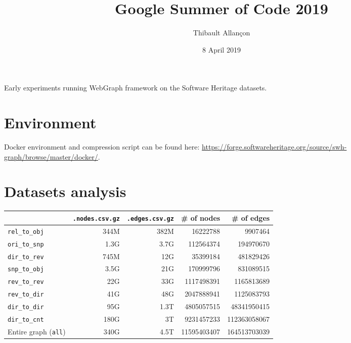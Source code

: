 \documentclass[11pt,a4paper]{article}
\title{Google Summer of Code 2019}
\author{Thibault Allançon}
\date{8 April 2019}
\begin{document}
\maketitle

Early experiments running WebGraph framework on the Software Heritage datasets.

\section{Environment}

Docker environment and compression script can be found here:
\url{https://forge.softwareheritage.org/source/swh-graph/browse/master/docker/}.

\section{Datasets analysis}

\begin{center}
    \begin{tabular}{@{} l *4r @{}}
        \toprule
        \multicolumn{1}{c}{} &
            \textbf{\texttt{.nodes.csv.gz}} &
            \textbf{\texttt{.edges.csv.gz}} &
            \textbf{\# of nodes} & \textbf{\# of edges} \\
        \midrule
        \texttt{rel\_to\_obj}
            & 344M & 382M & \num{16222788} & \num{9907464} \\
        \texttt{ori\_to\_snp}
            & 1.3G & 3.7G & \num{112564374} & \num{194970670} \\
        \texttt{dir\_to\_rev}
            & 745M & 12G & \num{35399184} & \num{481829426} \\
        \texttt{snp\_to\_obj}
            & 3.5G & 21G & \num{170999796} & \num{831089515} \\
        \texttt{rev\_to\_rev}
            & 22G & 33G & \num{1117498391} & \num{1165813689} \\
        \texttt{rev\_to\_dir}
            & 41G & 48G & \num{2047888941} & \num{1125083793} \\
        \texttt{dir\_to\_dir}
            & 95G & 1.3T & \num{4805057515} & \num{48341950415} \\
        \texttt{dir\_to\_cnt}
            & 180G & 3T & \num{9231457233} & \num{112363058067} \\
        \midrule
        Entire graph (\texttt{all})
            & 340G & 4.5T & \num{11595403407} & \num{164513703039} \\
        \bottomrule
    \end{tabular}
\end{center}
\end{document}
